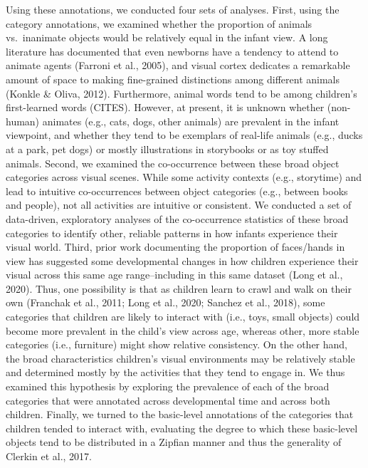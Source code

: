 \documentclass[10pt, letterpaper]{article}
\begin{document}
Using these annotations, we conducted four sets of analyses. First,
using the category annotations, we examined whether the proportion of
animals vs.~inanimate objects would be relatively equal in the infant
view. A long literature has documented that even newborns have a
tendency to attend to animate agents (Farroni et al., 2005), and visual
cortex dedicates a remarkable amount of space to making fine-grained
distinctions among different animals (Konkle \& Oliva, 2012).
Furthermore, animal words tend to be among children's first-learned
words (CITES). However, at present, it is unknown whether (non-human)
animates (e.g., cats, dogs, other animals) are prevalent in the infant
viewpoint, and whether they tend to be exemplars of real-life animals
(e.g., ducks at a park, pet dogs) or mostly illustrations in storybooks
or as toy stuffed animals. Second, we examined the co-occurrence between
these broad object categories across visual scenes. While some activity
contexts (e.g., storytime) and lead to intuitive co-occurrences between
object categories (e.g., between books and people), not all activities
are intuitive or consistent. We conducted a set of data-driven,
exploratory analyses of the co-occurrence statistics of these broad
categories to identify other, reliable patterns in how infants
experience their visual world. Third, prior work documenting the
proportion of faces/hands in view has suggested some developmental
changes in how children experience their visual across this same age
range--including in this same dataset (Long et al., 2020). Thus, one
possibility is that as children learn to crawl and walk on their own
(Franchak et al., 2011; Long et al., 2020; Sanchez et al., 2018), some
categories that children are likely to interact with (i.e., toys, small
objects) could become more prevalent in the child's view across age,
whereas other, more stable categories (i.e., furniture) might show
relative consistency. On the other hand, the broad characteristics
children's visual environments may be relatively stable and determined
mostly by the activities that they tend to engage in. We thus examined
this hypothesis by exploring the prevalence of each of the broad
categories that were annotated across developmental time and across both
children. Finally, we turned to the basic-level annotations of the
categories that children tended to interact with, evaluating the degree
to which these basic-level objects tend to be distributed in a Zipfian
manner and thus the generality of Clerkin et al., 2017.
\end{document}
